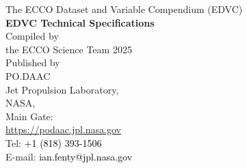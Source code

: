 \pagebreak
\begin{center}
    \vspace*{2cm}
    {\Large The ECCO Dataset and Variable Compendium (EDVC)}\\[2cm]
    {\LARGE \textbf{EDVC Technical Specifications}}\\[2cm]
    {\large Compiled by\\the ECCO Science Team 2025}\\[2cm]
    {\large Published by \\PO.DAAC\\
    Jet Propulsion Laboratory,\\
    NASA,\\
    Main Gate:\\
    \url{https://podaac.jpl.nasa.gov}}\\[2cm]
    {\large Tel: \textcolor{black}{+1 (818) 393-1506}\\[.5cm]
    E-mail: \textcolor{black}{ian.fenty@jpl.nasa.gov}}\\[2cm]
\end{center}


\newpage




